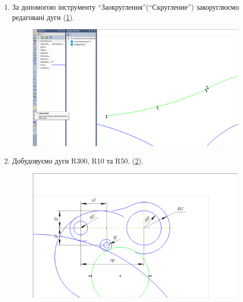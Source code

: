 \begin{enumerate}[leftmargin=*]
\item \label{item:round} За допомогою інструменту ``Заокруглення''(``Скругление'') закоруглюємо
  редаговані дуги (\ref{fig:lab4:step8}).
  \begin{figure}[!ht]
    \centering \includegraphics[width=0.9\linewidth]{./images/lab4/step8.png}
    \caption{\label{fig:lab4:step8}}
  \end{figure}
  \FloatBarrier

\item Добудовуємо дуги R300, R10 та R50.  (\ref{fig:lab4:step9}).
  \begin{figure}[!ht]
    \centering \includegraphics[width=0.9\linewidth]{./images/lab4/step9.png}
    \caption{\label{fig:lab4:step9}}
  \end{figure}
  \FloatBarrier


\end{enumerate}
